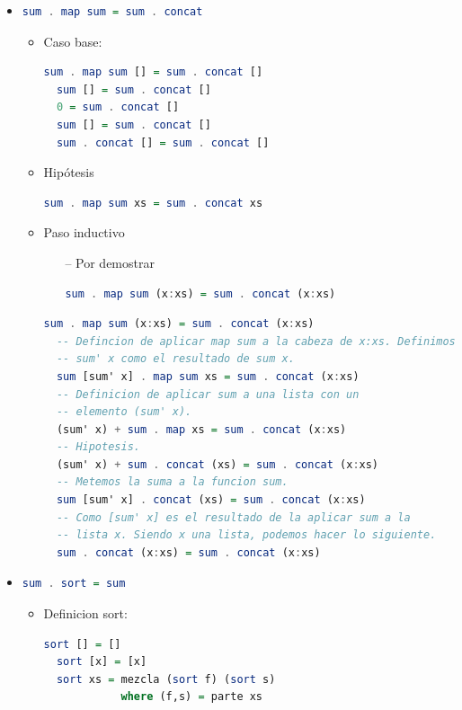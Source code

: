\documentclass[spanish,12pt,letterpaper]{article}
\begin{document}
\begin{itemize}
\item
  \begin{lstlisting}[language=Haskell]
  sum . map sum = sum . concat \end{lstlisting}
  \begin{itemize}
    \item Caso base:
    \begin{lstlisting}[language=Haskell]
  sum . map sum [] = sum . concat []
  sum [] = sum . concat []
  0 = sum . concat []
  sum [] = sum . concat []
  sum . concat [] = sum . concat [] \end{lstlisting}
  \item Hipótesis
    \begin{lstlisting}[language=Haskell]
  sum . map sum xs = sum . concat xs \end{lstlisting}
  \item Paso inductivo
    \begin{itemize}
    \item [--] Por demostrar
      \begin{lstlisting}[language=Haskell]
  sum . map sum (x:xs) = sum . concat (x:xs) \end{lstlisting}
    \end{itemize}
    \begin{lstlisting}[language=Haskell]
  sum . map sum (x:xs) = sum . concat (x:xs)
  -- Defincion de aplicar map sum a la cabeza de x:xs. Definimos
  -- sum' x como el resultado de sum x.
  sum [sum' x] . map sum xs = sum . concat (x:xs)
  -- Definicion de aplicar sum a una lista con un
  -- elemento (sum' x).
  (sum' x) + sum . map xs = sum . concat (x:xs)
  -- Hipotesis.
  (sum' x) + sum . concat (xs) = sum . concat (x:xs)
  -- Metemos la suma a la funcion sum.
  sum [sum' x] . concat (xs) = sum . concat (x:xs)
  -- Como [sum' x] es el resultado de la aplicar sum a la
  -- lista x. Siendo x una lista, podemos hacer lo siguiente.
  sum . concat (x:xs) = sum . concat (x:xs)\end{lstlisting}
  \end{itemize}

\item
  \begin{lstlisting}[language=Haskell]
  sum . sort = sum \end{lstlisting}
  \begin{itemize}
  	\item Definicion sort:
  	\begin{lstlisting}[language=Haskell]
  sort [] = []
  sort [x] = [x]
  sort xs = mezcla (sort f) (sort s)
            where (f,s) = parte xs\end{lstlisting}


\end{itemize}
\end{itemize}
\end{document}
